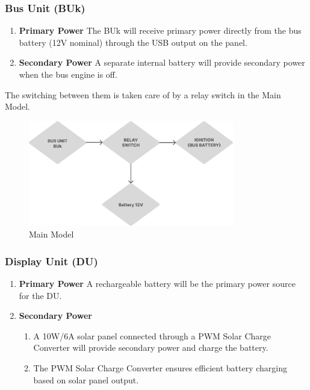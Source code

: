 \documentclass[12pt]{article} %
\begin{document}
\subsubsection{Bus Unit (BUk)}
\begin{enumerate}
    \item \textbf{Primary Power} The BUk will receive primary power directly from the bus battery (12V nominal) through the USB output on the panel.
    \item \textbf{Secondary Power} A separate internal battery will provide secondary power when the bus engine is off.
\end{enumerate}
The switching between them is taken care of by a relay switch in the Main Model.

\begin{figure}[H]
    \centering
    \includegraphics[width=0.8\textwidth]{Group 456.png}
    \caption{Main Model}
    \label{fig:enter-label}
\end{figure}
\subsubsection{Display Unit (DU)}
\begin{enumerate}
    \item \textbf{Primary Power} A rechargeable battery will be the primary power source for the DU.
    \item \textbf{Secondary Power} 
    \begin{enumerate}
        \item A 10W/6A solar panel connected through a \acrshort{PWM} Solar Charge Converter will provide secondary power and charge the battery.
        \item The \acrshort{PWM} Solar Charge Converter ensures efficient battery charging based on solar panel output.
    \end{enumerate}
\end{enumerate}
\end{document}
